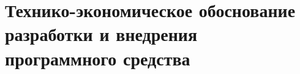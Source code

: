 \section{Технико-экономическое обоснование разработки и внедрения программного средства}
\label{sec:economics}




